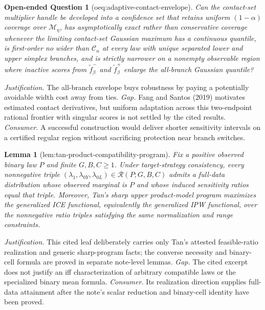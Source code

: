 \documentclass{article}
\newtheorem{lemma}{Lemma}
\newtheorem{openendedquestion}{Open-ended Question}
\begin{document}
\begin{openendedquestion}[oeq:adaptive-contact-envelope]\label{oeq:adaptive-contact-envelope}
Can the contact-set multiplier handle be developed into a confidence set that retains uniform \((1-\alpha)\) coverage over \(\mathcal M_\eta\), has asymptotically exact rather than conservative coverage whenever the limiting contact-set Gaussian maximum has a continuous quantile, is first-order no wider than \(\mathcal C_n\) at every law with unique separated lower and upper simplex branches, and is strictly narrower on a nonempty observable region where inactive scores from \(\widetilde f_\beta^-\) and \(\widetilde f_\beta^+\) enlarge the all-branch Gaussian quantile?
\end{openendedquestion}
\par\smallskip\noindent \textit{Justification.} The all-branch envelope buys robustness by paying a potentially avoidable width cost away from ties. \textit{Gap.} Fang and Santos (2019) motivates estimated contact derivatives, but uniform adaptation across this two-endpoint rational frontier with singular scores is not settled by the cited results. \textit{Consumer.} A successful construction would deliver shorter sensitivity intervals on a certified regular region without sacrificing protection near branch switches.

\begin{lemma}[lem:tan-product-compatibility-program]\label{lem:tan-product-compatibility-program}
Fix a positive observed binary law \(P\) and finite \(G,B,C\geq 1\). Under target-strategy consistency, every nonnegative triple \((\lambda_1,\lambda_{0Y},\lambda_{0L})\in\mathcal R(P;G,B,C)\) admits a full-data distribution whose observed marginal is \(P\) and whose induced sensitivity ratios equal that triple. Moreover, Tan's sharp upper product-model program maximizes the generalized ICE functional, equivalently the generalized IPW functional, over the nonnegative ratio triples satisfying the same normalization and range constraints.
\end{lemma}
\par\smallskip\noindent \textit{Justification.} This cited leaf deliberately carries only Tan's attested feasible-ratio realization and generic sharp-program facts; the converse necessity and binary-cell formula are proved in separate note-level lemmas. \textit{Gap.} The cited excerpt does not justify an iff characterization of arbitrary compatible laws or the specialized binary mean formula. \textit{Consumer.} Its realization direction supplies full-data attainment after the note's scalar reduction and binary-cell identity have been proved.
\end{document}
